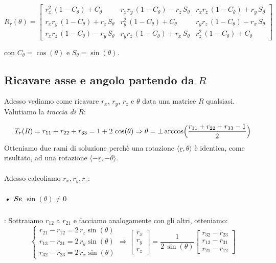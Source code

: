 \begin{equation*}
	R_{\underline{r}}(\theta) =
	\begin{bmatrix}
		r_x^2\,(1-C_{\theta})+C_{\theta} & r_x r_y\,(1-C_{\theta})-r_z\,S_{\theta} & r_x r_z\,(1-C_{\theta})+r_y\,S_{\theta} \\
		r_x r_y\,(1-C_{\theta})+r_z\,S_{\theta} & r_y^2\,(1-C_{\theta})+C_{\theta} & r_y r_z\,(1-C_{\theta})-r_x\,S_{\theta} \\
		r_x r_z\,(1-C_{\theta})-r_y\,S_{\theta} & r_y r_z\,(1-C_{\theta})+r_x\,S_{\theta} & r_z^2\,(1-C_{\theta})+C_{\theta} 
	\end{bmatrix}
\end{equation*}

con $C_{\theta} = \cos(\theta)$ e $S_{\theta} = \sin(\theta)$.

\subsection{Ricavare asse e angolo partendo da $R$}
Adesso vediamo come ricavare $r_x$, $r_y$, $r_z$ e $\theta$ data una matrice $R$ qualsiasi. Valutiamo la \emph{traccia di $R$}:
 
\begin{equation*}
	T_{r}(R)= r_{11} + r_{22} + r_{33} = 1 + 2\, \cos(\theta) \Rightarrow \theta = \pm \arccos\Bigl(\dfrac{r_{11} + r_{22} + r_{33} - 1}{2}\Bigr)
\end{equation*}
Otteniamo due rami di soluzione perchè una rotazione $\langle\underline{r}, \theta\rangle$ è identica, come risultato, ad una rotazione $\langle-\underline{r}, -\theta\rangle$.

\paragraph{}
Adesso calcoliamo $r_x, r_y, r_z$:

\subparagraph{• Se $\sin(\theta) \neq 0$}:
Sottraiamo $r_{12}$ a $r_{21}$ e facciamo analogamente con gli altri, otteniamo:
\begin{equation*}
	\begin{cases}
		r_{21}-r_{12} = 2 \, r_z \sin(\theta)\\
		r_{13}-r_{31} = 2 \, r_y \sin(\theta)\\
		r_{32}-r_{23} = 2 \, r_x \sin(\theta)
	\end{cases}
	\Rightarrow
	\begin{bmatrix}
		r_x \\
		r_y \\
		r_z 
	\end{bmatrix}
	= \dfrac{1}{2\,\sin(\theta)}
	\begin{bmatrix}
		r_{32}-r_{23} \\
		r_{13}-r_{31} \\
		r_{21}-r_{12}
	\end{bmatrix}
\end{equation*}

